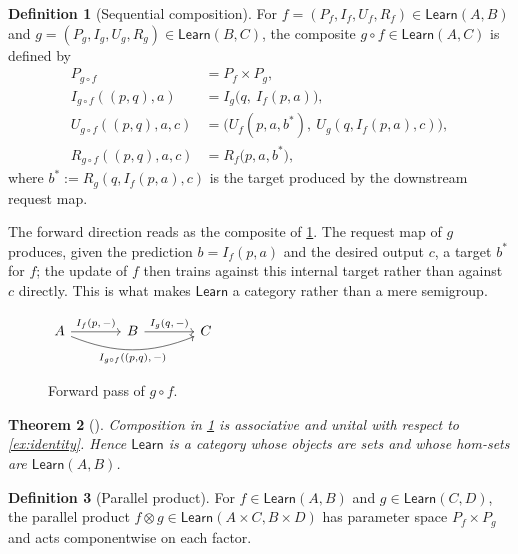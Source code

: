 \documentclass[journal,10pt]{IEEEtran}
\theoremstyle{plain}
\newtheorem{theorem}{Theorem}
\theoremstyle{definition}
\newtheorem{definition}[theorem]{Definition}
\theoremstyle{remark}
\newcommand{\Learn}{\mathsf{Learn}}
\begin{document}
\begin{definition}[Sequential composition]
\label{def:learner-comp}
For $f = (P_f, I_f, U_f, R_f) \in \Learn(A, B)$ and
$g = (P_g, I_g, U_g, R_g) \in \Learn(B, C)$,
the composite $g \circ f \in \Learn(A, C)$ is defined by
\begin{align*}
P_{g \circ f}
   &= P_f \times P_g, \\
I_{g \circ f}((p, q), a)
   &= I_g\bigl(q,\ I_f(p, a)\bigr), \\
U_{g \circ f}((p, q), a, c)
   &= \bigl(U_f(p, a, b^*),\ U_g(q, I_f(p, a), c)\bigr), \\
R_{g \circ f}((p, q), a, c)
   &= R_f\bigl(p, a, b^*\bigr),
\end{align*}
where $b^* := R_g(q, I_f(p, a), c)$ is the target produced by the
downstream request map.
\end{definition}

The forward direction reads as the composite of \cref{fig:learner-fwd}.
The request map of $g$ produces, given the prediction
$b = I_f(p, a)$ and the desired output $c$, a target $b^*$ for $f$;
the update of $f$ then trains against this internal target rather
than against $c$ directly. This is what makes $\Learn$ a category
rather than a mere semigroup.

\begin{figure}[!t]
\centering
$\begin{tikzcd}[column sep=large, row sep=normal]
A \arrow[r, "{I_f(p,\,-)}"]
  \arrow[rr, "{I_{g \circ f}((p,q),\,-)}"', bend right=22]
& B \arrow[r, "{I_g(q,\,-)}"]
& C
\end{tikzcd}$
\caption{Forward pass of $g \circ f$.}
\label{fig:learner-fwd}
\end{figure}

\begin{theorem}[\cite{FongSpivakTuyeras,CGGWZ}]\label{thm:learn-cat}
Composition in \cref{def:learner-comp} is associative and unital with
respect to \cref{ex:identity}. Hence $\Learn$ is a category whose
objects are sets and whose hom-sets are $\Learn(A, B)$.
\end{theorem}

\begin{definition}[Parallel product]\label{def:parallel}
For $f \in \Learn(A, B)$ and $g \in \Learn(C, D)$, the parallel
product $f \otimes g \in \Learn(A \times C, B \times D)$ has
parameter space $P_f \times P_g$ and acts componentwise on each
factor.
\end{definition}
\end{document}
